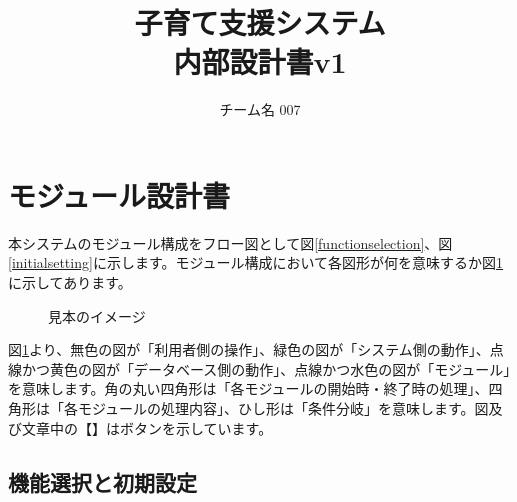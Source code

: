 \documentclass[a4j]{jarticle}
\title{
\vspace{30mm}
{\bf 子育て支援システム}
\\
\vspace{5mm}
{\bf 内部設計書v1\\
}
\vspace{120mm}
}
\author{
\vspace{5mm}
チーム名 007\\
\vspace{5mm}
}
\begin{document}
\maketitle
\tableofcontents
\newpage

\section{モジュール設計書}
本システムのモジュール構成をフロー図として図\ref{functionselection}、図\ref{initialsetting}に示します。モジュール構成において各図形が何を意味するか図\ref{sample}に示してあります。


\begin{figure}[H]
    \begin{center}
    \caption {見本のイメージ}
    \label{sample}
    \end{center}
\end{figure}

図\ref{sample}より、無色の図が「利用者側の操作」、緑色の図が「システム側の動作」、点線かつ黄色の図が「データベース側の動作」、点線かつ水色の図が「モジュール」を意味します。角の丸い四角形は「各モジュールの開始時・終了時の処理」、四角形は「各モジュールの処理内容」、ひし形は「条件分岐」を意味します。図及び文章中の【】はボタンを示しています。

\subsection{機能選択と初期設定}
\end{document}
